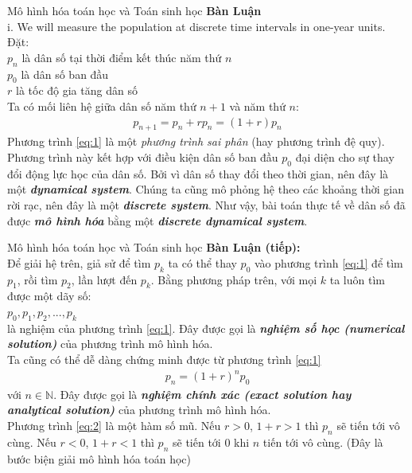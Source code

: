 \documentclass[pdf,aspectratio=169]{beamer}
\newcommand{\N}{\mathbb{N}}
\begin{document}
\begin{frame}{Mô hình hóa toán học và Toán sinh học}
    \textbf{Bàn Luận} \\
    i. We will measure the population at discrete time intervals in
    one-year units. Đặt: \\
    \quad $p_n$ là dân số tại thời điểm kết thúc năm thứ $n$ \\
    \quad $p_0$ là dân số ban đầu \\
    \quad $r$ là tốc độ gia tăng dân số \\
    Ta có mối liên hệ giữa dân số năm thứ $n+1$ và năm thứ $n$:
    \begin{align}
        \label{eq:1}
        p_{n+1} = p_n + rp_n = (1+r)p_n
    \end{align}
    Phương trình \ref{eq:1} là một \textit{phương trình sai phân} (hay phương trình đệ quy).
    Phương trình này kết hợp với điều kiện dân số ban đầu $p_0$ đại diện cho sự thay đổi động lực học của dân số.
    Bởi vì dân số thay đổi theo thời gian, nên đây là một \textbf{\textit{dynamical system}}.
    Chúng ta cũng mô phỏng hệ theo các khoảng thời gian rời rạc, nên đây là một \textbf{\textit{discrete system}}.
    Như vậy, bài toán thực tế về dân số đã được \textbf{\textit{mô hình hóa}} bằng một \textbf{\textit{discrete dynamical system}}.
\end{frame}

\begin{frame}{Mô hình hóa toán học và Toán sinh học}
    \textbf{Bàn Luận (tiếp):} \\
    Để giải hệ trên, giả sử để tìm $p_k$ ta có thể thay $p_0$ vào phương trình \ref{eq:1} để tìm $p_1$, rồi tìm $p_2$,
    lần lượt đến $p_k$. Bằng phương pháp trên, với mọi $k$ ta luôn tìm được một dãy số: \\
    \quad $p_0, p_1, p_2, ..., p_k$\\
    là nghiệm của phương trình \ref{eq:1}. Đây được gọi là \textbf{\textit{nghiệm số học (numerical solution)}} của phương trình mô hình hóa.\\
    Ta cũng có thể dễ dàng chứng minh được từ phương trình \ref{eq:1}
    \begin{align}
        \label{eq:2}
        p_{n} = (1+r)^np_0
    \end{align}
    với $n\in \N$. Đây được gọi là \textbf{\textit{nghiệm chính xác (exact solution hay analytical solution)}} của phương trình mô hình hóa.\\
    Phương trình \ref{eq:2} là một hàm số mũ. Nếu $r>0$, $1+r>1$ thì $p_{n}$ sẽ tiến tới vô cùng.
    Nếu $r<0$, $1+r<1$ thì $p_{n}$ sẽ tiến tới $0$ khi $n$ tiến tới vô cùng. (Đây là bước biện giải mô hình hóa toán học)
\end{frame}
\end{document}
